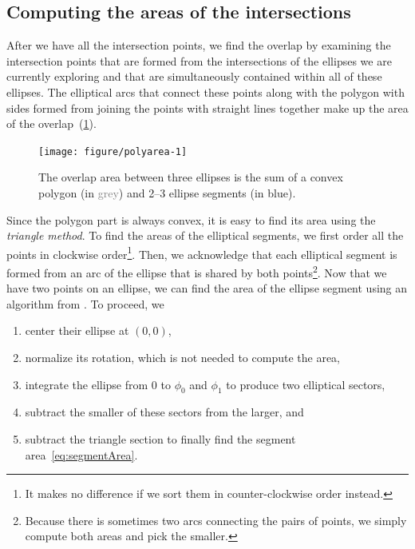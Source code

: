 \documentclass[
  oneside,
  openany,
  numbers=noendperiod,
  parskip=half,
  bibliography=totoc
]{scrbook}\usepackage[]{graphicx}\usepackage{xcolor}
\newenvironment{knitrout}{}{} %
\begin{document}
\subsection{Computing the areas of the intersections}
\label{sec:areas-intersections}

After we have all the intersection points, we find the overlap by examining the
intersection points that are formed from the intersections of the ellipses we
are currently exploring and that are simultaneously contained within all of
these ellipses. The elliptical arcs that connect these points along
with the polygon with sides formed from joining the points with straight lines
together make up the area of the overlap~(\cref{fig:polyarea}).

\begin{figure}[hbtp]
\caption{The overlap area between three ellipses is the sum of a convex
polygon (in \textcolor{Grey}{grey}) and 2--3 ellipse segments (in
\textcolor{SteelBlue4}{blue}).}
\label{fig:polyarea}
\begin{knitrout}\small
{}\color{fgcolor}

{\centering \texttt{[image: figure/polyarea-1]}

}



\end{knitrout}
\end{figure}

Since the polygon part is always convex, it is easy to find its area using the
\emph{triangle method}. To find the areas of the elliptical segments, we first
order all the points in clockwise order\footnote{It makes no difference if we
sort them in counter-clockwise order instead.}. Then, we acknowledge that each
elliptical segment is formed from an arc of the ellipse that is shared by both
points\footnote{Because there is sometimes two arcs connecting the pairs of
points, we simply compute both areas and pick the smaller.}. Now that we have
two points on an ellipse, we can find the area of the ellipse segment using an
algorithm from \citet{Eberly_2016}. To proceed, we

\begin{enumerate}
\item center their ellipse at $(0, 0)$,
\item normalize its rotation, which is not needed to compute the area,
\item integrate the ellipse from $0$ to $\phi_0$ and $\phi_1$ to produce two
  elliptical sectors,
\item subtract the smaller of these sectors from the larger, and
\item subtract the triangle section to finally find the segment
  area~\eqref{eq:segmentArea}.
\end{enumerate}
\end{document}
